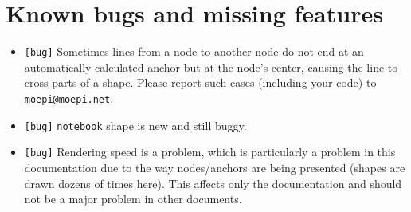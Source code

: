 \documentclass{scrartcl}
\begin{document}
\section{Known bugs and missing features}
\begin{itemize}\itemsep0pt
	\item \texttt{[bug]} Sometimes lines from a node to another node do not end
	at an automatically calculated anchor but at the node's center, causing the
	line to cross parts of a shape.
	Please report such cases (including your code) to \texttt{moepi@moepi.net}.
	\item \texttt{[bug]} \texttt{notebook} shape is new and still buggy.
	\item \texttt{[bug]} Rendering speed is a problem, which is particularly a
	problem in this documentation due to the way nodes/anchors are being
	presented (shapes are drawn dozens of times here).
	This affects only the documentation and should not be a major problem in
	other documents.
\end{itemize}
\end{document}
